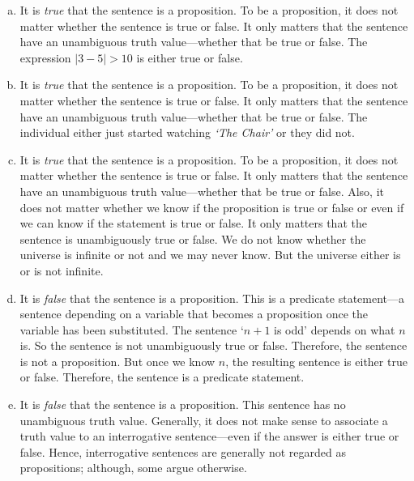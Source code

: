 \documentclass[11pt,letterpaper]{article}
\begin{document}
\sol 
\begin{enumerate}[(a)]
\item It is \textit{true} that the sentence is a proposition. To be a proposition, it does not matter whether the sentence is true or false. It only matters that the sentence have an unambiguous truth value---whether that be true or false. The expression $|3 - 5| > 10$ is either true or false. 

\item It is \textit{true} that the sentence is a proposition. To be a proposition, it does not matter whether the sentence is true or false. It only matters that the sentence have an unambiguous truth value---whether that be true or false. The individual either just started watching \textit{`The Chair'} or they did not. 

\item It is \textit{true} that the sentence is a proposition. To be a proposition, it does not matter whether the sentence is true or false. It only matters that the sentence have an unambiguous truth value---whether that be true or false. Also, it does not matter whether we know if the proposition is true or false or even if we can know if the statement is true or false. It only matters that the sentence is unambiguously true or false. We do not know whether the universe is infinite or not and we may never know. But the universe either is or is not infinite. 

\item It is \textit{false} that the sentence is a proposition. This is a predicate statement---a sentence depending on a variable that becomes a proposition once the variable has been substituted. The sentence `$n + 1$ is odd' depends on what $n$ is. So the sentence is not unambiguously true or false. Therefore, the sentence is not a proposition. But once we know $n$, the resulting sentence is either true or false. Therefore, the sentence is a predicate statement. 

\item It is \textit{false} that the sentence is a proposition. This sentence has no unambiguous truth value. Generally, it does not make sense to associate a truth value to an interrogative sentence---even if the answer is either true or false. Hence, interrogative sentences are generally not regarded as propositions; although, some argue otherwise.  
\end{enumerate}



\newpage
\end{document}
